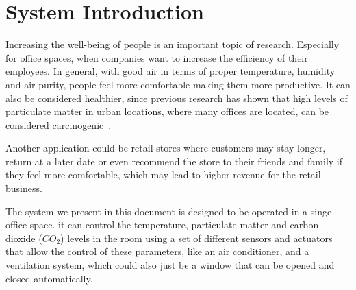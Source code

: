 \section{System Introduction}\label{sec:system-introduction}

Increasing the well-being of people is an important topic of research.
Especially for office spaces, when companies want to increase the efficiency of their employees.
In general, with good air in terms of proper temperature, humidity and air purity, people feel more comfortable making them more productive.
It can also be considered healthier, since previous research has shown that high levels of particulate matter in urban locations, where many offices are located, can be considered carcinogenic~\cite{pehnec2020carcinogenic}.

Another application could be retail stores where customers may stay longer, return at a later date or even recommend the store to their friends and family if they feel more comfortable, which may lead to higher revenue for the retail business.


The system we present in this document is designed to be operated in a singe office space.
it can control the temperature, particulate matter and carbon dioxide ($CO_2$) levels in the room using a set of different sensors and actuators that allow the control of these parameters, like an air conditioner, and a ventilation system, which could also just be a window that can be opened and closed automatically.



